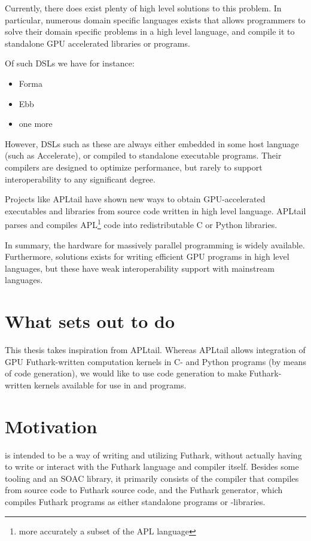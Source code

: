 Currently, there does exist plenty of high level solutions to this problem.
In particular, numerous domain specific languages exists that allows programmers
to solve their domain specific problems in a high level language, and compile it
to standalone GPU accelerated libraries or programs.

Of such DSLs we have for instance:
\begin{itemize}
\item Forma
\item Ebb
\item one more
\end{itemize}

However, DSLs such as these are always either embedded in some host language
(such as Accelerate), or compiled to standalone executable programs. Their
compilers are designed to optimize performance, but rarely to support
interoperability to any significant degree.

Projects like APLtail\cite{apltail} have shown new ways to obtain GPU-accelerated
executables and libraries from source code written in  high level language. APLtail parses
and compiles APL\footnote{more accurately a subset of the APL language} code into redistributable C or Python libraries.

In summary, the hardware for massively parallel programming is widely available.
Furthermore, solutions exists for writing efficient GPU programs in high level
languages, but these have weak interoperability support with mainstream
languages.

\section{What \fshark{} sets out to do}
This thesis takes inspiration from APLtail\cite{apltail}.
Whereas APLtail allows integration of GPU Futhark-written computation kernels in C- and Python programs (by
means of code generation), we would like to use code generation to make
Futhark-written kernels available for use in \csharp{} and \fsharp{} programs.





\section*{Motivation}
\fshark{} is intended to be a way of writing and utilizing Futhark, without
actually having to write or interact with the Futhark language and compiler
itself. Besides some tooling and an \fsharp{} SOAC library, it primarily consists of the \fshark{} compiler that compiles from
\fsharp{} source code to Futhark source code, and the Futhark \csharp{}
generator, which compiles Futhark programs as either standalone \csharp{}
programs or -libraries.

